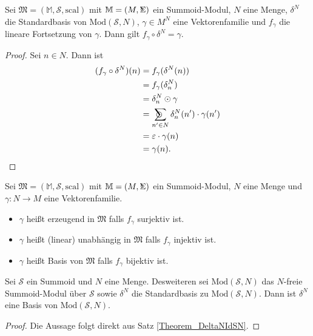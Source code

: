 \documentclass{article}
\DeclareMathOperator*{\Sigmacirc}{%
  \ThisStyle{\mathop{\ensurestackMath{\stackinset{c}{-0.75\LMpt}{c}{}{%
  \rotatebox[origin=lb]{-90}{$\circ$}}{\SavedStyle\Sigma}}}}}
\DeclareMathOperator*{\sumcirc}{%
  \ThisStyle{\mathop{\ensurestackMath{\stackinset{c}{-1.5\LMpt}{c}{}{%
  \rotatebox[origin=lb]{-90}{$\SavedStyle\scalerel*{\bm\Circle}{%
  i}$}}{\SavedStyle\sum}}}}}
\begin{document}
\begin{theorem}
  Sei $\mathfrak{M} = (\mathbb{M}, \mathcal{S}, \text{scal})$ mit $\mathbb{M} = (M, \Sigmacirc)$ ein Summoid-Modul, $N$ eine Menge,
  $\delta^N$ die Standardbasis von $\text{Mod}(\mathcal{S}, N)$,
  $\gamma \in M^N$ eine Vektorenfamilie und
  $f_\gamma$ die lineare Fortsetzung von $\gamma$.
  Dann gilt $f_\gamma \circ \delta^N = \gamma$.
\end{theorem}
\begin{proof}
  Sei $n \in N$.
  Dann ist
  \begin{align*}
    (f_\gamma \circ \delta^N)(n) 
    &= f_\gamma(\delta^N(n)) \\
    &= f_\gamma(\delta^N_n) \\
    &= \delta^N_n \odot \gamma \\
    &= \sumcirc_{n' \in N}\delta^N_n(n') \cdot \gamma(n') \\
    &= \varepsilon \cdot \gamma(n) \\
    &= \gamma(n).
  \end{align*}
\end{proof}

\begin{definition}
  Sei $\mathfrak{M} = (\mathbb{M}, \mathcal{S}, \text{scal})$ mit $\mathbb{M} = (M, \Sigmacirc)$ ein Summoid-Modul, $N$ eine Menge
  und $\gamma \colon N \to M$ eine Vektorenfamilie.
  \begin{itemize}
    \item $\gamma$ heißt erzeugend in $\mathfrak{M}$ falls $f_\gamma$ surjektiv ist.
    \item $\gamma$ heißt (linear) unabhängig in $\mathfrak{M}$ falls $f_\gamma$ injektiv ist.
    \item $\gamma$ heißt Basis von $\mathfrak{M}$ falls $f_\gamma$ bijektiv ist.
  \end{itemize}
\end{definition}

\begin{theorem}
  Sei $\mathcal{S}$ ein Summoid und
  $N$ eine Menge. Desweiteren sei
  $\text{Mod}(\mathcal{S}, N)$ das $N$-freie Summoid-Modul über $\mathcal{S}$ sowie
  $\delta^N$ die Standardbasis zu $\text{Mod}(\mathcal{S}, N)$.
  Dann ist $\delta^N$ eine Basis von $\text{Mod}(\mathcal{S}, N)$.
\end{theorem}
\begin{proof}
  Die Aussage folgt direkt aus Satz \ref{Theorem_DeltaNIdSN}.
\end{proof}
\end{document}

